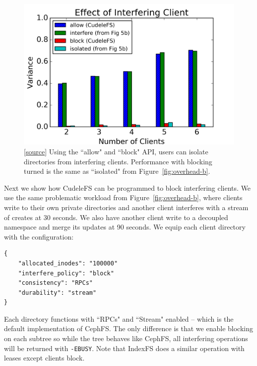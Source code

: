 \begin{figure}[tb]
\centering
\includegraphics[width=1.0\linewidth]{graphs/slowdown-allow-block.png}
\caption{
[\href{https://...}{source}]
Using the ``allow" and ``block" API, users can isolate directories from
interfering clients. Performance with blocking turned is the same as
``isolated" from Figure~\ref{fig:overhead-b}.
\label{fig:slowdown-allow-block}}
\end{figure}

Next we show how CudeleFS can be programmed to block interfering clients. We
use the same problematic workload from Figure~\ref{fig:overhead-b}, where
clients write to their own private directories and another client interferes with a stream of creates at
30 seconds.  We also have another client write to a decoupled namespace and
merge its updates at 90 seconds.  We equip each client directory with the
configuration:

\begin{listing}[tb]
\begin{verbatim}
{     
    "allocated_inodes": "100000"
    "interfere_policy": "block"
    "consistency": "RPCs"
    "durability": "stream"
}
\end{verbatim}
\end{listing}

Each directory functions with ``RPCs"
and ``Stream" enabled -- which is the default implementation of CephFS. The only
difference is that we enable blocking on each subtree so while the tree behaves
like CephFS, all interfering operations will be returned with \texttt{-EBUSY}.
Note that IndexFS does a similar operation with leases except clients block.

